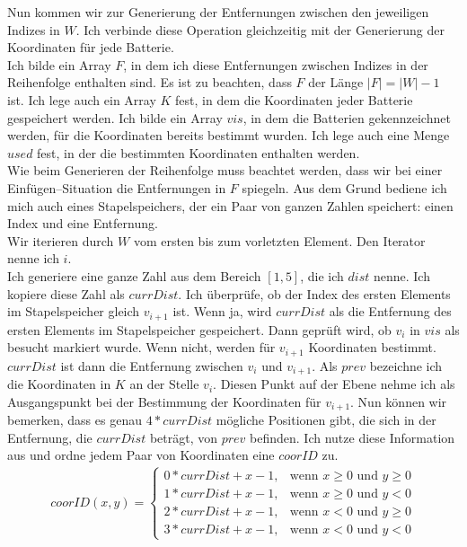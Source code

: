 \documentclass[a4paper,10pt,ngerman]{scrartcl}
\begin{document}
Nun kommen wir zur Generierung der Entfernungen zwischen den jeweiligen Indizes in $W$.
Ich verbinde diese Operation gleichzeitig mit der Generierung der Koordinaten für jede Batterie.\\
Ich bilde ein Array $F$, in dem ich diese Entfernungen zwischen Indizes in der Reihenfolge enthalten sind.
Es ist zu beachten, dass $F$ der Länge $|F| = |W|-1$ ist.
Ich lege auch ein Array $K$ fest, in dem die Koordinaten jeder Batterie gespeichert werden.
Ich bilde ein Array $vis$, in dem die Batterien gekennzeichnet werden, für die Koordinaten bereits bestimmt wurden.
Ich lege auch eine Menge $used$ fest, in der die bestimmten Koordinaten enthalten werden.\\
Wie beim Generieren der Reihenfolge muss beachtet werden, 
dass wir bei einer Einfügen--Situation die Entfernungen in $F$ spiegeln. Aus dem Grund bediene ich
mich auch eines Stapelspeichers, der ein Paar von ganzen Zahlen speichert: einen Index und eine Entfernung.\\
Wir iterieren durch $W$ vom ersten bis zum vorletzten Element. Den Iterator nenne ich $i$.\\
Ich generiere eine ganze Zahl aus dem Bereich $[1,5]$, die ich $dist$ nenne.
Ich kopiere diese Zahl als $currDist$. Ich überprüfe, ob der Index des ersten Elements im Stapelspeicher 
gleich $v_{i+1}$ ist. Wenn ja, wird $currDist$ als die Entfernung des ersten Elements im Stapelspeicher gespeichert.
Dann geprüft wird, ob $v_i$ in $vis$ als besucht markiert wurde. Wenn nicht, werden für $v_{i+1}$ Koordinaten 
bestimmt. $currDist$ ist dann die Entfernung zwischen $v_i$ und $v_{i+1}$.
Als $prev$ bezeichne ich die Koordinaten in $K$ an der Stelle $v_{i}$.
Diesen Punkt auf der Ebene nehme ich als Ausgangspunkt bei der Bestimmung der Koordinaten für $v_{i+1}$.
Nun können wir bemerken, dass es genau $4*currDist$ mögliche Positionen gibt, die sich in der Entfernung, die $currDist$
beträgt, von $prev$ befinden. Ich nutze diese Information aus und ordne jedem Paar von Koordinaten eine $coorID$ zu.
\begin{align}
  coorID(x,y) =
  \begin{cases}
      0*currDist + x-1,& \text{wenn } x \geqslant 0 \text{ und } y \geqslant 0\\
      1*currDist + x-1,& \text{wenn } x \geqslant 0 \text{ und } y < 0\\
      2*currDist + x-1,& \text{wenn } x < 0 \text{ und } y \geqslant 0\\
      3*currDist + x-1,& \text{wenn } x < 0 \text{ und } y < 0
  \end{cases}
\label{eq:coorID}
\end{align}
\end{document}
